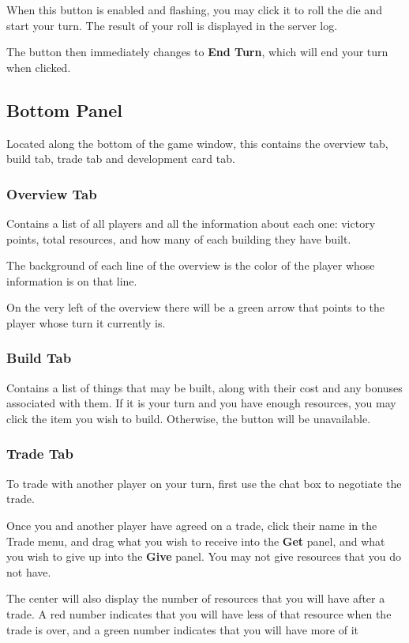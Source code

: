 \documentclass[12pt,letterpaper,titlepage]{article}
\begin{document}
	When this button is enabled and flashing, you may click it to roll the die and start your turn. The result of your roll is displayed in the server log.
	
	The button then immediately changes to \textbf{End Turn}, which will end your turn when clicked.

	\subsection{Bottom Panel}
	Located along the bottom of the game window, this contains the overview tab, build tab, trade tab and development card tab.
		
		\subsubsection{Overview Tab}
		Contains a list of all players and all the information about each one: victory points, total resources, and how many of each building they have built.
		
		The background of each line of the overview is the color of the player whose information is on that line.
		
		On the very left of the overview there will be a green arrow that points to the player whose turn it currently is.
		
		\subsubsection{Build Tab}
		Contains a list of things that may be built, along with their cost and any bonuses associated with them. If it is your turn and you have enough resources, you may click the item you wish to build. Otherwise, the button will be unavailable.
		
		\subsubsection{Trade Tab}
		To trade with another player on your turn, first use the chat box to negotiate the trade.
		
		Once you and another player have agreed on a trade, click their name in the Trade menu, and drag what you wish to receive into the \textbf{Get} panel, and what you wish to give up into the \textbf{Give} panel. You may not give resources that you do not have.
		
		The center will also display the number of resources that you will have after a trade. A red number indicates that you will have less of that resource when the trade is over, and a green number indicates that you will have more of it 
		
\end{document}
